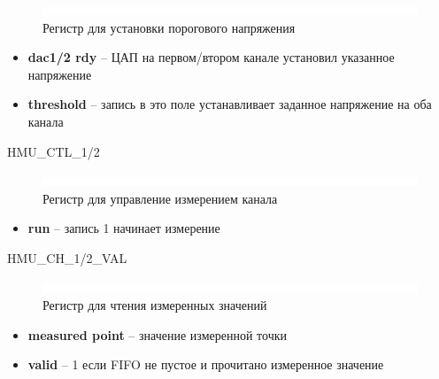 \begin{figure}[ht!] 
	\center
	\includegraphics  {my_folder/images//blank}
	\caption{Регистр для установки порогового напряжения} 
	\label{fig:thr-reg}  
\end{figure}
\FloatBarrier
\noindent
\begin{itemize}[label={}]
	\item \textbf{dac1/2 rdy} -- ЦАП на первом/втором канале установил указанное напряжение
	\item \textbf{threshold} -- запись в это поле устанавливает заданное напряжение на оба канала\\
\end{itemize}
\newpage
\FloatBarrier

\begin{register}{H}{MU\_CTL\_1/2}{}%
\label{example}%
%
%
 \regnewline%
\end{register}

\begin{figure}[ht!] 
	\center
	\includegraphics  {my_folder/images//blank}
	\caption{Регистр для управление измерением канала} 
	\label{fig:mu-ctl-reg}  
\end{figure}
\FloatBarrier
\begin{itemize}[label={}]
	\item \textbf{run} -- запись 1 начинает измерение\\
\end{itemize}


\begin{register}{H}{MU\_CH\_1/2\_VAL}{}%
\label{example}%
%
%
%
 \regnewline%
\end{register}

\begin{figure}[ht!] 
	\center
	\includegraphics  {my_folder/images//blank}
	\caption{Регистр для чтения измеренных значений} 
	\label{fig:mu-p-reg}  
\end{figure}
\FloatBarrier
\begin{itemize}[label={}]
	\item \textbf{measured point} -- значение измеренной точки
	\item \textbf{valid} -- 1 если FIFO не пустое и прочитано измеренное значение\\
\end{itemize}

\FloatBarrier


\newpage